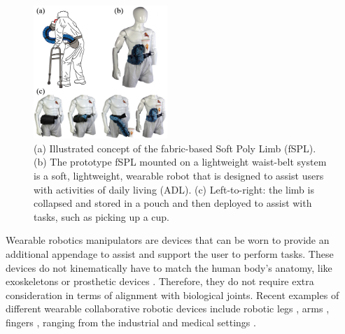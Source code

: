 \documentclass[letterpaper, 10 pt, conference]{ieeeconf}  %
\begin{document}
\begin{figure}[t!]
\centering
\includegraphics[width=0.45\textwidth]{Figures/fig1_new_v2}
\caption{ (a) Illustrated concept of the fabric-based Soft Poly Limb (fSPL). (b) The prototype fSPL mounted on a lightweight waist-belt system is a soft, lightweight, wearable robot that is designed to assist users with activities of daily living (ADL). (c) Left-to-right: the limb is collapsed and stored in a pouch and then deployed to assist with tasks, such as picking up a cup.}
\label{fig:fig1}
\vspace{-1.5em}
\end{figure}

Wearable robotics manipulators are devices that can be worn to provide an additional appendage to assist and support the user to perform tasks. These devices do not kinematically have to match the human body's anatomy, like exoskeletons \cite{gopura2011} or prosthetic devices \cite{bogue2009}. Therefore, they do not require extra consideration in terms of alignment with biological joints. Recent examples of different wearable collaborative robotic devices include robotic legs \cite{kurek2017,parietti2015}, arms \cite{parietti2014,saraiji2018,vatsal2017}, fingers \cite{hussain2017b,wu2015,tiziani2017}, ranging from the industrial \cite{parietti2014} and medical settings \cite{tiziani2017}. 

\end{document}
